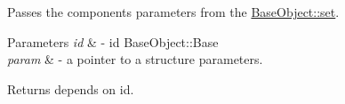 Passes the components parameters from the \hyperlink{classcsad_1_1_base_object_aa8d3a855874527b14a5c56f629789b1f}{Base\-Object\-::set}. 
\begin{DoxyParams}{Parameters}
{\em id} & -\/ id Base\-Object\-::\-Base \\
\hline
{\em param} & -\/ a pointer to a structure parameters. \\
\hline
\end{DoxyParams}
\begin{DoxyReturn}{Returns}
depends on id. 
\end{DoxyReturn}
